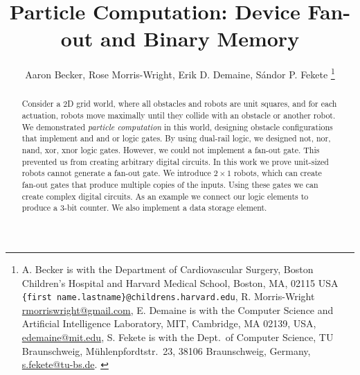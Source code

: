 \documentclass[letterpaper, 10 pt, conference]{ieeeconf}
\begin{document}


\title{\LARGE \bf 
Particle Computation:  Device Fan-out and Binary Memory 
}
\author{Aaron Becker,
Rose Morris-Wright,
Erik D. Demaine,
S\'andor P. Fekete
\thanks{{A. Becker is with the Department of Cardiovascular Surgery,  Boston Children's Hospital and Harvard Medical School, Boston, MA, 02115 USA {\tt\small \{first name.lastname\}@childrens.harvard.edu}, 
R. Morris-Wright  \protect\url{rmorriswright@gmail.com},
E. Demaine is with the Computer Science and Artificial Intelligence Laboratory, MIT,
     Cambridge, MA 02139, USA,      \protect\url{edemaine@mit.edu},
S. Fekete is with the Dept.~of Computer Science, TU Braunschweig,  M\"uhlenpfordtstr.~23, 38106 Braunschweig, Germany,
      \protect\url{s.fekete@tu-bs.de}.
}
} %
} %
\maketitle



\begin{abstract} %
Consider a 2D grid world, where all obstacles and robots are unit squares, and for each actuation, robots move maximally until they collide with an obstacle or another robot. We demonstrated \emph{particle computation} in this world, designing obstacle configurations that implement {\sc and} and {\sc or} logic gates.  By using dual-rail logic, we designed {\sc not, nor, nand, xor, xnor} logic gates.  However, we could not implement a {\sc fan-out} gate. This prevented us from creating arbitrary digital circuits.  In this work we prove unit-sized robots cannot generate a {\sc fan-out} gate.  We introduce $2\times 1$ robots, which can create fan-out gates that produce multiple copies of the inputs.  Using these gates we can create complex digital circuits.  As an example we connect our logic elements to produce a 3-bit counter.
   We also implement a data storage element.
\end{abstract}
\end{document}
